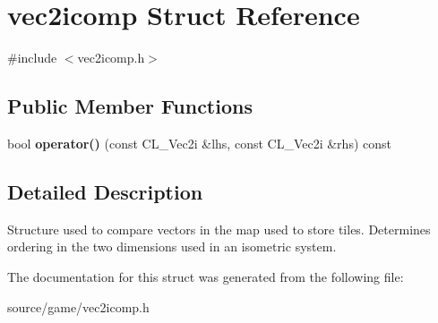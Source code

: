 \hypertarget{structvec2icomp}{
\section{vec2icomp Struct Reference}
\label{structvec2icomp}
}


{\ttfamily \#include $<$vec2icomp.h$>$}

\subsection*{Public Member Functions}
\begin{DoxyCompactItemize}
\item 
\hypertarget{structvec2icomp_addc04e57ccb170bea4f4edfe9345105d}{
bool {\bfseries operator()} (const CL\_\-Vec2i \&lhs, const CL\_\-Vec2i \&rhs) const }
\label{structvec2icomp_addc04e57ccb170bea4f4edfe9345105d}

\end{DoxyCompactItemize}


\subsection{Detailed Description}
Structure used to compare vectors in the map used to store tiles. Determines ordering in the two dimensions used in an isometric system. 

The documentation for this struct was generated from the following file:\begin{DoxyCompactItemize}
\item 
source/game/vec2icomp.h\end{DoxyCompactItemize}
